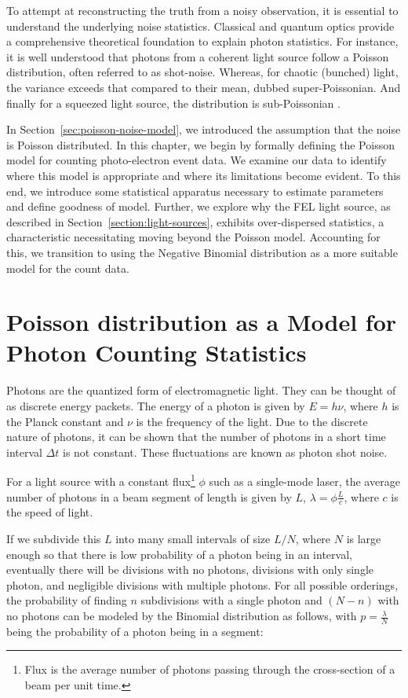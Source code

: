 To attempt at reconstructing the truth from a noisy observation, it is essential to understand the underlying noise statistics. Classical and quantum optics provide a comprehensive theoretical foundation to explain photon statistics. For instance, it is well understood that photons from a coherent light source follow a Poisson distribution, often referred to as shot-noise. Whereas, for chaotic (bunched) light, the variance exceeds that compared to their mean, dubbed super-Poissonian. And finally for a squeezed light source, the distribution is sub-Poissonian \cite[Chapter~5]{foxQuantumOpticsIntroduction2006}.

In Section~\ref{sec:poisson-noise-model}, we introduced the assumption that the noise is Poisson distributed. In this chapter, we begin by formally defining the Poisson model for counting photo-electron event data. We examine our data to identify where this model is appropriate and where its limitations become evident. To this end, we introduce some statistical apparatus necessary to estimate parameters and define goodness of model. Further, we explore why the \gls{FEL} light source, as described in Section~\ref{section:light-sources}, exhibits over-dispersed statistics, a characteristic necessitating moving beyond the Poisson model. Accounting for this, we transition to using the Negative Binomial distribution as a more suitable model for the count data.


\section{Poisson distribution as a Model for Photon Counting Statistics}\label{section:photon-counting-stats}

Photons are the quantized form of electromagnetic light. They can be thought of as discrete energy packets. The energy of a photon is given by $E = h\nu$, where $h$ is the Planck constant and $\nu$ is the frequency of the light. Due to the discrete nature of photons, it can be shown that the number of photons in a short time interval $\Delta t$ is not constant. These fluctuations are known as photon shot noise.

For a light source with a constant flux\footnote{Flux is the average number of photons passing through the cross-section of a beam per unit time.} $\phi$ such as a single-mode laser, the average number of photons in a beam segment of length is given by $L$, $\lambda = \phi \frac{L}{c}$, where $c$ is the speed of light.

If we subdivide this $L$ into many small intervals  of size $L/N$, where $N$ is large enough so that there is low probability of a photon being in an interval, eventually there will be divisions with no photons, divisions with only single photon, and negligible divisions with multiple photons. For all possible orderings, the probability of finding $n$ subdivisions with a single photon and $(N-n)$ with no photons can be modeled by the Binomial distribution as follows, with $p=\frac{\lambda}{N}$ being the probability of a photon being in a segment:

